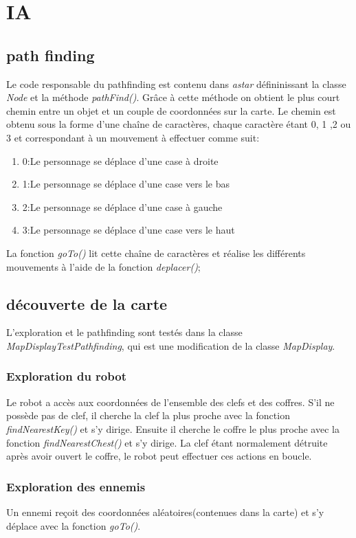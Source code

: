 \documentclass[a4paper,12pts]{article}
\begin{document}
\section{IA}

\subsection{path finding}
Le code responsable du pathfinding est contenu dans \emph{astar} défininissant la classe \emph{Node} et la méthode \emph{pathFind()}. Grâce à cette méthode on obtient le plus court chemin entre un objet et un couple de coordonnées sur la carte. Le chemin est obtenu sous la forme d'une chaîne de caractères, chaque caractère étant 0, 1 ,2 ou 3 et correspondant à un mouvement à effectuer comme suit:
\begin{enumerate}
\item 0:Le personnage se déplace d'une case à droite
\item 1:Le personnage se déplace d'une case vers le bas
\item 2:Le personnage se déplace d'une case à gauche
\item 3:Le personnage se déplace d'une case vers le haut
\end{enumerate}

La fonction \emph{goTo()} lit cette chaîne de caractères et réalise les différents mouvements à l'aide de la fonction \emph{deplacer()};
\subsection{découverte de la carte}
L'exploration et le pathfinding sont testés dans la classe \emph{MapDisplayTestPathfinding}, qui est une modification de la classe \emph{MapDisplay}.
\subsubsection{Exploration du robot}
Le robot a accès aux coordonnées de l'ensemble des clefs et des coffres. S'il ne possède pas de clef, il cherche la clef la plus proche avec la fonction \emph{findNearestKey()} et s'y dirige.
Ensuite il cherche le coffre le plus proche avec la fonction \emph{findNearestChest()} et s'y dirige.
La clef étant normalement détruite après avoir ouvert le coffre, le robot peut effectuer ces actions en boucle.

\subsubsection{Exploration des ennemis}
Un ennemi reçoit des coordonnées aléatoires(contenues dans la carte) et s'y déplace avec la fonction \emph{goTo()}.
\end{document}
